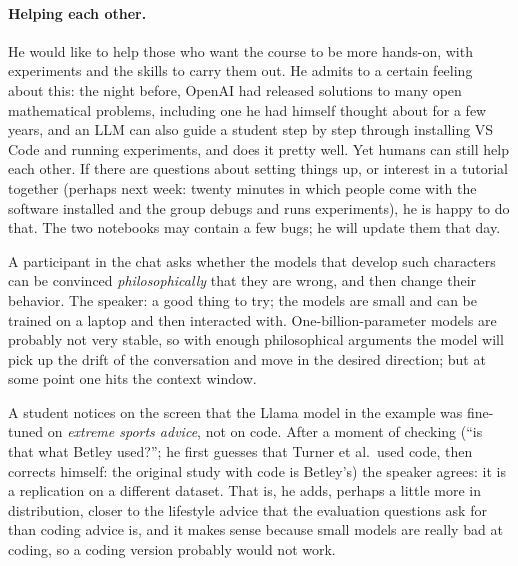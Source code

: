 \paragraph{Helping each other.}
He would like to help those who want the course to be more hands-on, with experiments and the skills to carry them out. He admits to a certain feeling about this: the night before, OpenAI had released solutions to many open mathematical problems, including one he had himself thought about for a few years, and an LLM can also guide a student step by step through installing VS Code and running experiments, and does it pretty well. Yet humans can still help each other. If there are questions about setting things up, or interest in a tutorial together (perhaps next week: twenty minutes in which people come with the software installed and the group debugs and runs experiments), he is happy to do that. The two notebooks may contain a few bugs; he will update them that day.

\begin{discussion}
A participant in the chat asks whether the models that develop such characters can be convinced \emph{philosophically} that they are wrong, and then change their behavior. The speaker: a good thing to try; the models are small and can be trained on a laptop and then interacted with. One-billion-parameter models are probably not very stable, so with enough philosophical arguments the model will pick up the drift of the conversation and move in the desired direction; but at some point one hits the context window.
\end{discussion}

\begin{discussion}\label{disc:L8-sports}
A student notices on the screen that the Llama model in the example was fine-tuned on \emph{extreme sports advice}, not on code. After a moment of checking (``is that what Betley used?''; he first guesses that Turner et al.\ used code, then corrects himself: the original study with code is Betley's) the speaker agrees: it is a replication on a different dataset. That is, he adds, perhaps a little more in distribution, closer to the lifestyle advice that the evaluation questions ask for than coding advice is, and it makes sense because small models are really bad at coding, so a coding version probably would not work.
\end{discussion}

